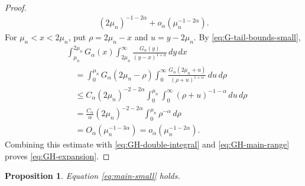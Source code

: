 \documentclass[11pt]{amsart}
\numberwithin{equation}{section}
\newtheorem{proposition}[proposition]{Proposition}
\theoremstyle{remark}
\begin{document}
\begin{proof}
\begin{equation}
\begin{aligned}
 (2\mu_n)^{-1-2\alpha}
 +o_\alpha(\mu_n^{-1-2\alpha}).
 \end{aligned}
\end{equation}
For $\mu_n<x<2\mu_n$, put $\rho=2\mu_n-x$ and $u=y-2\mu_n$.
By \eqref{eq:G-tail-bounds-small},
\[
 \begin{aligned}
 &\int_{\mu_n}^{2\mu_n}G_\alpha(x)\int_{2\mu_n}^\infty
 \frac{G_\alpha(y)}{(y-x)^{1+\alpha}}\,dy\,dx\\
 &\quad=\int_0^{\mu_n}G_\alpha(2\mu_n-\rho)
 \int_0^\infty\frac{G_\alpha(2\mu_n+u)}
 {(\rho+u)^{1+\alpha}}\,du\,d\rho\\
 &\quad\le C_\alpha(2\mu_n)^{-2-2\alpha}
 \int_0^{\mu_n}\int_0^\infty
 (\rho+u)^{-1-\alpha}\,du\,d\rho\\
 &\quad=\frac{C_\alpha}{\alpha}(2\mu_n)^{-2-2\alpha}
 \int_0^{\mu_n}\rho^{-\alpha}\,d\rho\\
 &\quad=O_\alpha(\mu_n^{-1-3\alpha})
 =o_\alpha(\mu_n^{-1-2\alpha}).
 \end{aligned}
\]
Combining this estimate with \eqref{eq:GH-double-integral} and
\eqref{eq:GH-main-range} proves \eqref{eq:GH-expansion}.
\end{proof}
\begin{proposition}\label{prop:small}
Equation \eqref{eq:main-small} holds.
\end{proposition}
\end{document}
